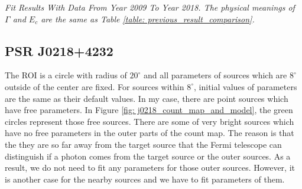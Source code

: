 \documentclass[12pt]{report}
\newcommand{\mycaption}[1]{\caption{\textit{\footnotesize #1}}}
\begin{document}
          \begin{table}[!ht]
            \centering
            \mycaption{Fit Results With Data From Year 2009 To Year 2018. The physical meanings of 
            $\Gamma$ and $E_c$ are the same as Table \ref{table: previous_result_comparison}.}
            \label{table: 2018_fit_data}
          \end{table}
          \vspace{1cm}            
            

        \subsection{PSR J0218+4232}
          \label{j0218}
          The ROI is a circle with radius of $20^\circ$ and all parameters of sources which are $8^\circ$ outside 
          of the center are fixed. For sources within $8^\circ$, initial values of parameters are the same as
          their default values.
          In my case, there are point sources which have free parameters. 
          In Figure
          \ref{fig: j0218_count_map_and_model}, the green circles represent those free sources.
          There are some of very bright sources which have no free parameters
          in the outer parts of the count map. The reason is that the they are so far away from the target source
          that the Fermi telescope can distinguish if a photon comes from the target source or the outer sources.
          As a result, we do not need to fit any parameters for those outer sources. 
          However, it is another case for the nearby sources and we have to fit parameters of them.
          
\end{document}
